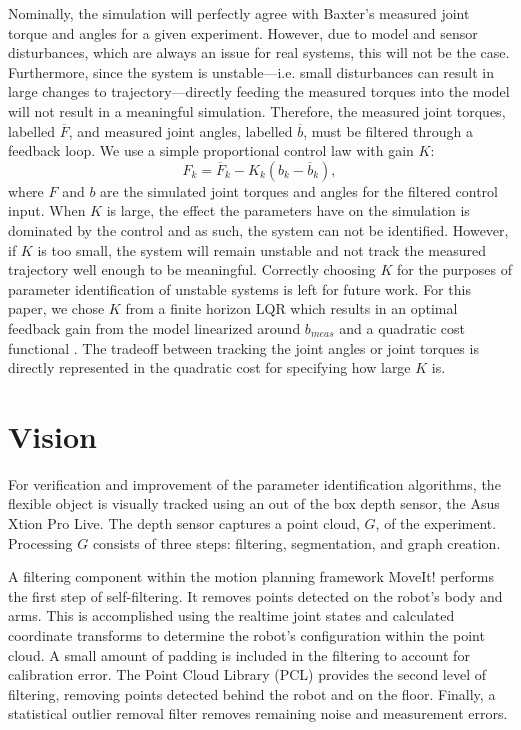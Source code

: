\documentclass[runningheads,a4paper]{llncs}
\begin{document}
Nominally, the simulation will perfectly agree with Baxter's measured joint torque and angles for a given experiment. However, due to model and sensor disturbances, which are always an issue for real systems, this will not be the case. Furthermore, since the system is unstable---i.e. small disturbances can result in large changes to trajectory---directly feeding the measured torques into the model will not result in a meaningful simulation. Therefore, the measured joint torques, labelled $\overline{F}$, and measured joint angles, labelled $\overline{b}$, must be filtered through a feedback loop. We use a simple proportional control law with gain $K$: 
\[
F_k = \overline{F}_k - K_k (b_k - \overline{b}_k),
\]
where $F$ and $b$ are the simulated joint torques and angles for the filtered control input.  When $K$ is large, the effect the parameters have on the simulation is dominated by the control and as such, the system can not be identified. However, if $K$ is too small, the system will remain unstable and not track the measured trajectory well enough to be meaningful.  Correctly choosing $K$ for the purposes of parameter identification of unstable systems is left for future work.  For this paper, we chose $K$ from a finite horizon LQR which results in an optimal feedback gain from the model linearized around $b_{meas}$ and a quadratic cost functional \cite{anderson_moore}.  The tradeoff between tracking the joint angles or joint torques is directly represented in the quadratic cost for specifying how large $K$ is.


\section{Vision}
\label{sec-vis}
For verification and improvement of the parameter identification algorithms, the flexible object is visually tracked using an out of the box depth sensor, the Asus Xtion Pro Live. The depth sensor captures a point cloud, $G$, of the experiment. Processing $G$ consists of three steps: filtering, segmentation, and graph creation. 

A filtering component within the motion planning framework MoveIt! \cite{coleman_etal_barrier} performs the first step of self-filtering. It removes points detected on the robot’s body and arms. This is accomplished using the realtime joint states and calculated coordinate transforms to determine the robot’s configuration within the point cloud. A small amount of padding is included in the filtering to account for calibration error. The Point Cloud Library (PCL) \cite{rusu20113d} provides the second level of filtering, removing points detected behind the robot and on the floor. Finally, a statistical outlier removal filter removes remaining noise and measurement errors.
\end{document}
